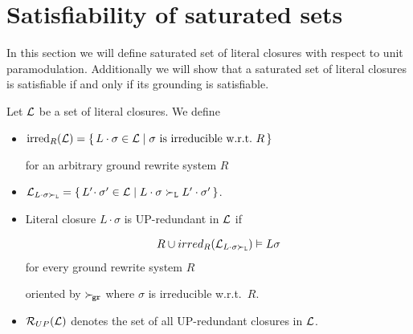 \section{Satisfiability of saturated sets}\label{sec:inst:saturated:sets}

In this section we will define saturated set of literal closures
with respect to unit paramodulation.
Additionally we will show that a saturated set of literal closures
is satisfiable if and only if its grounding is satisfiable.

   \begin{definition}[UP-Redundancy]
        Let \( \mathcal{L} \) be a set of literal closures. We define
       \begin{itemize}
           \item \( \operatorname{irred}_R(\mathcal{L}) =
           \{ \,
            L\cdot\sigma\in\mathcal{L} \mid
           \sigma\text{ is irreducible w.r.t.~}R
           \, \} \)

        for an arbitrary ground rewrite system \( R \)

       \item
       \(
       \mathcal{L}_{L\cdot\sigma\mathrel\succ_{\mathtt{L}}} =
       \{ \,
        L'\!\cdot\sigma'\in\mathcal{L} \mid
        L\cdot\sigma\mathrel\succ_{\mathtt{L}} L'\cdot\sigma'
       \, \}
         \).

       \item Literal closure \( L\cdot\sigma \) is UP-redundant in \( \mathcal{L} \) if

       \begin{gather*}
            R \cup irred_R(\mathcal{L}_{L\cdot\sigma\mathrel\succ_{\mathtt{L}}}) \vDash L\sigma
       \end{gather*}
        for every ground rewrite system \( R \)

        oriented by \( \mathrel\succ_{\!\mathtt{gr}} \)
        where \( \sigma \) is irreducible w.r.t.~\( R \).

       \item
       \( \mathcal{R}_{UP}(\mathcal{L}) \) denotes the set of all UP-redundant closures in \( \mathcal{L} \).
   \end{itemize}
\end{definition}

